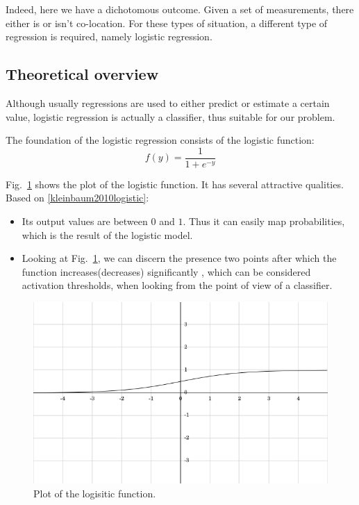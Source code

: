 Indeed, here we have a dichotomous outcome. Given a set of measurements, there either is or isn't co-location. For these types of situation, a different type of regression is required, namely logistic regression. 

\subsection{Theoretical overview}

Although usually regressions are used to either predict or estimate a certain value, logistic regression is actually a classifier, thus suitable for our problem. 

The foundation of the logistic regression consists of the logistic function:
\begin{equation*}
f(y) = \frac{1}{1+e^{-y}}
\end{equation*}

Fig.~\ref{pic:logit} shows the plot of the logistic function. It has several attractive qualities. Based on \ref{kleinbaum2010logistic}:

\begin{itemize}
  \item Its output values are between $0$ and $1$. Thus it can easily map probabilities, which is the result of the logistic model.
  \item Looking at Fig.~\ref{pic:logit}, we can discern the presence two points after which the function increases(decreases) significantly , which can be considered activation thresholds, when looking from the point of view of a classifier.  
\end{itemize}

\begin{figure}[h]
	\begin{center}
		\includegraphics[scale=0.5]{figures/logit.png}
	\end{center}
	
	\caption{Plot of the logisitic function.}
	\label{pic:logit}

\end{figure}


